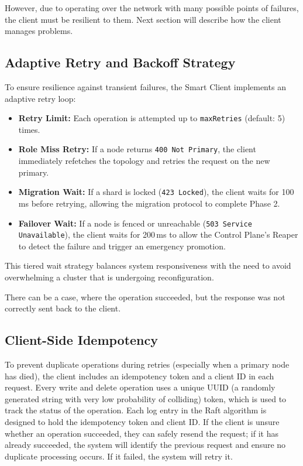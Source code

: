 \documentclass[shortabstract]{iithesis}
\begin{document}
However, due to operating over the network with many possible points of failures, the client must be resilient to them. Next section will describe how the client manages problems.

\subsection{Adaptive Retry and Backoff Strategy}
To ensure resilience against transient failures, the Smart Client implements an adaptive retry loop:
\begin{itemize}
    \item \textbf{Retry Limit:} Each operation is attempted up to \texttt{maxRetries} (default: 5) times.
    \item \textbf{Role Miss Retry:} If a node returns \texttt{400 Not Primary}, the client immediately refetches the topology and retries the request on the new primary.
    \item \textbf{Migration Wait:} If a shard is locked (\texttt{423 Locked}), the client waits for 100\,ms before retrying, allowing the migration protocol to complete Phase 2.
    \item \textbf{Failover Wait:} If a node is fenced or unreachable (\texttt{503 Service Unavailable}), the client waits for 200\,ms to allow the Control Plane's Reaper to detect the failure and trigger an emergency promotion.
\end{itemize}
This tiered wait strategy balances system responsiveness with the need to avoid overwhelming a cluster that is undergoing reconfiguration.

There can be a case, where the operation succeeded, but the response was not correctly sent back to the client. 

\subsection{Client-Side Idempotency} \label{subsec:idempotency}

To prevent duplicate operations during retries (especially when a primary node has died), the client includes an idempotency token and a client ID in each request. Every write and delete operation uses a unique UUID (a randomly generated string with very low probability of colliding) token, which is used to track the status of the operation. Each log entry in the Raft algorithm is designed to hold the idempotency token and client ID. If the client is unsure whether an operation succeeded, they can safely resend the request; if it has already succeeded, the system will identify the previous request and ensure no duplicate processing occurs. If it failed, the system will retry it.\\
\end{document}
